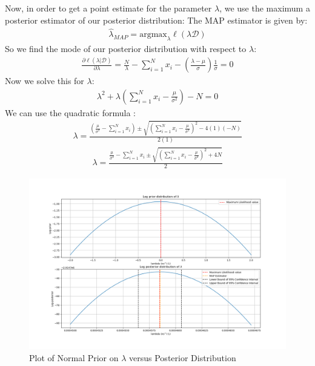 Now, in order to get a point estimate for the parameter $\lambda$, we use the maximum a posterior estimator of our posterior distribution:
The MAP estimator is given by:
\begin{align}
        \hat{\lambda}_{MAP}=\textrm{argmax}_{\lambda}\ell(\lambda \mathcal{D})
\end{align}
So we find the mode of our posterior distribution with respect to $\lambda$:
\begin{align}
        \frac{\partial \ell(\lambda | \mathcal{D})}{\partial \lambda}=\frac{N}{\lambda}-\sum_{i=1}^Nx_i-\left( \frac{\lambda-\mu}{\sigma} \right)\frac{1}{\sigma}=0
\end{align}
Now we solve this for $\lambda$:
\begin{align}
        \lambda^2+\lambda\left( \sum_{i=1}^Nx_i-\frac{\mu}{\sigma^2} \right)-N=0
\end{align}
We can use the quadratic formula \cite{euclid}:
\begin{align}
        \lambda=\frac{\left( \frac{\mu}{\sigma^2}-\sum_{i=1}^Nx_i \right)\pm \sqrt{\left( \sum_{i=1}^Nx_i-\frac{\mu}{\sigma^2} \right)^2-4(1)(-N)}}{2(1)}
\end{align}
\begin{align}
        \lambda=\frac{\frac{\mu}{\sigma^2}-\sum_{i=1}^Nx_i\pm \sqrt{\left( \sum_{i=1}^Nx_i-\frac{\mu}{\sigma^2} \right)^2+4N}}{2}
\end{align}
\begin{figure}[H]
    \flushleft
    \includegraphics[scale=0.25]{img/prior_versus_posterior} 
    \caption{Plot of Normal Prior on $\lambda$ versus Posterior Distribution}
    \label{prior_versus_posterior}
\end{figure} 

